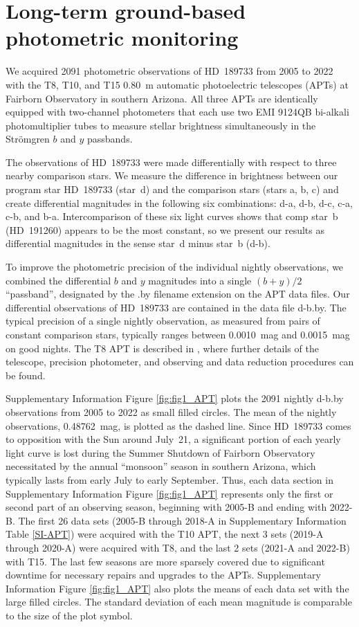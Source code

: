 \documentclass[sn-standardnature]{sn-jnl}%
\begin{document}
\section*{Long-term ground-based photometric monitoring}

We acquired 2091 photometric observations of HD~189733 from 2005 to 2022 with the T8, T10, and T15 0.80~m automatic photoelectric telescopes (APTs) at Fairborn Observatory in southern Arizona.  All three APTs are identically equipped with two-channel photometers that each use two EMI 9124QB bi-alkali photomultiplier tubes to measure stellar brightness simultaneously in the Str\"omgren $b$ and $y$ passbands.


The observations of HD~189733 were made differentially with respect to three nearby comparison stars.  We measure the difference in brightness between our program star HD~189733 (star~d) and the comparison stars (stars a, b, c) and create differential magnitudes in the following six combinations: d-a, d-b, d-c, c-a, c-b, and b-a.  Intercomparison of these six light curves shows that comp star~b (HD~191260) appears to be the most constant, so we present our results as differential magnitudes in the sense star~d minus star~b (d-b).


To improve the photometric precision of the individual nightly observations, we combined the differential $b$ and $y$ magnitudes into a single $(b+y)/2$ ``passband'', designated by the .by filename extension on the APT data files.  Our differential observations of HD~189733 are contained in the data file d-b.by.  The typical precision of a single nightly observation, as measured from pairs of constant comparison stars, typically ranges between 0.0010~mag and 0.0015~mag on good nights.  The T8 APT is described in , where further details of the telescope, precision photometer, and observing and data reduction procedures can be found.


Supplementary Information Figure \ref{fig:fig1_APT} plots the 2091 nightly d-b.by observations from 2005 to 2022 as small filled circles.  The mean of the nightly observations, 0.48762~mag, is plotted as the dashed line.  Since HD~189733 comes to opposition with the Sun around July~21, a significant portion of each yearly light curve is lost during the Summer Shutdown of Fairborn Observatory necessitated by the annual ``monsoon'' season in southern Arizona, which typically lasts from early July to early September.  Thus, each data section in Supplementary Information Figure \ref{fig:fig1_APT} represents only the first or second part of an observing season, beginning with 2005-B and ending with 2022-B.  The first 26 data sets (2005-B through 2018-A in Supplementary Information Table \ref{SI-APT}) were acquired with the T10 APT, the next 3 sets (2019-A through 2020-A) were acquired with T8, and the last 2 sets (2021-A and 2022-B) with T15.  The last few seasons are more sparsely covered due to significant downtime for necessary repairs and upgrades to the APTs. Supplementary Information Figure \ref{fig:fig1_APT} also plots the means of each data set with the large filled circles. The standard deviation of each mean magnitude is comparable to the size of the plot symbol.
\end{document}
